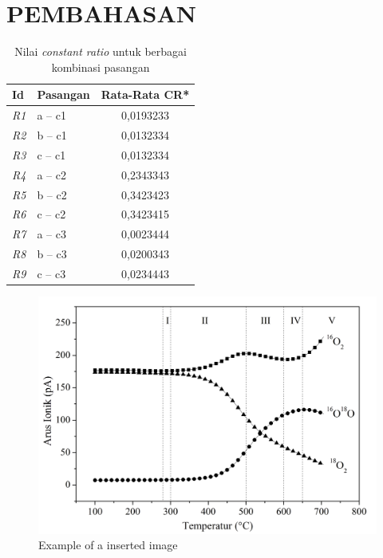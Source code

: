 \section{PEMBAHASAN}
\begin{table}[H]
	\centering
	\caption{Nilai \textit{constant ratio} untuk berbagai kombinasi pasangan}
	\label{tab:cr}
	\begin{tabular}{l l c}
		\toprule
		\textbf{Id} & \textbf{Pasangan} & \textbf{Rata-Rata CR*} \\
		\midrule
		\textit{R1} & a -- c1 & 0,0193233 \\
		\textit{R2} & b -- c1 & 0,0132334 \\
		\textit{R3} & c -- c1 & 0,0132334 \\
		\textit{R4} & a -- c2 & 0,2343343 \\
		\textit{R5} & b -- c2 & 0,3423423 \\
		\textit{R6} & c -- c2 & 0,3423415 \\
		\textit{R7} & a -- c3 & 0,0023444 \\
		\textit{R8} & b -- c3 & 0,0200343 \\
		\textit{R9} & c -- c3 & 0,0234443 \\
		\bottomrule
	\end{tabular}
\end{table}
\lipsum
\begin{figure}[H]
	\centering
	\includegraphics[width=0.7\linewidth]{fig1.png}
	\caption{Example of a inserted image}
	\label{fig:example}
\end{figure}